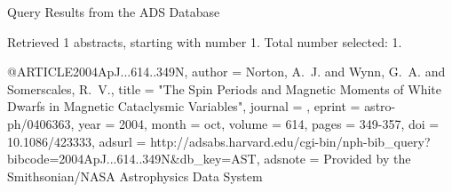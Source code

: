 Query Results from the ADS Database


Retrieved 1 abstracts, starting with number 1.  Total number selected: 1.

@ARTICLE{2004ApJ...614..349N,
   author = {{Norton}, A.~J. and {Wynn}, G.~A. and {Somerscales}, R.~V.},
    title = "{The Spin Periods and Magnetic Moments of White Dwarfs in Magnetic Cataclysmic Variables}",
  journal = {\apj},
   eprint = {astro-ph/0406363},
     year = 2004,
    month = oct,
   volume = 614,
    pages = {349-357},
      doi = {10.1086/423333},
   adsurl = {http://adsabs.harvard.edu/cgi-bin/nph-bib_query?bibcode=2004ApJ...614..349N&db_key=AST},
  adsnote = {Provided by the Smithsonian/NASA Astrophysics Data System}
}


